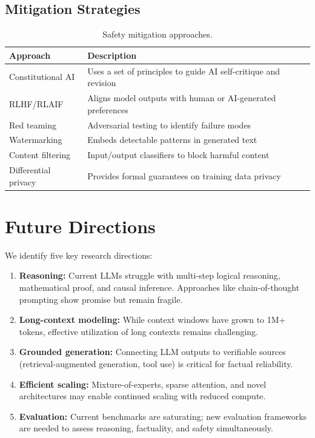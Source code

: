 \documentclass[
    language=english,
    doctype=review-article,
    institution=none,
]{../../omnilatex}
\begin{document}
\subsection{Mitigation Strategies}

\begin{table}[htbp]
    \centering
    \caption{Safety mitigation approaches.}
    \label{tab:safety}
    \begin{tabular}{@{}lp{10cm}@{}}
        \toprule
        Approach & Description \\
        \midrule
        Constitutional AI & Uses a set of principles to guide AI self-critique and revision \\
        RLHF/RLAIF & Aligns model outputs with human or AI-generated preferences \\
        Red teaming & Adversarial testing to identify failure modes \\
        Watermarking & Embeds detectable patterns in generated text \\
        Content filtering & Input/output classifiers to block harmful content \\
        Differential privacy & Provides formal guarantees on training data privacy \\
        \bottomrule
    \end{tabular}
\end{table}

\section{Future Directions}
\label{sec:future}

We identify five key research directions:

\begin{enumerate}
    \item \textbf{Reasoning:} Current LLMs struggle with multi-step logical
          reasoning, mathematical proof, and causal inference. Approaches
          like chain-of-thought prompting \cite{wei2022chain} show promise
          but remain fragile.
    \item \textbf{Long-context modeling:} While context windows have grown
          to 1M+ tokens, effective utilization of long contexts remains
          challenging.
    \item \textbf{Grounded generation:} Connecting LLM outputs to verifiable
          sources (retrieval-augmented generation, tool use) is critical for
          factual reliability.
    \item \textbf{Efficient scaling:} Mixture-of-experts, sparse attention,
          and novel architectures may enable continued scaling with reduced
          compute.
    \item \textbf{Evaluation:} Current benchmarks are saturating; new
          evaluation frameworks are needed to assess reasoning, factuality,
          and safety simultaneously.
\end{enumerate}
\end{document}
